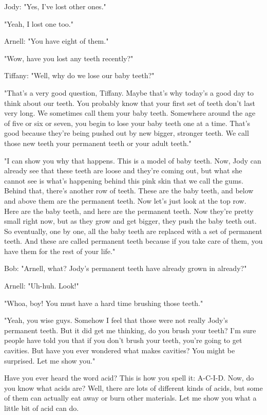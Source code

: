 Jody: "Yes, I've lost other ones."

"Yeah, I lost one too."

Arnell: "You have eight of them."

"Wow, have you lost any teeth recently?"

Tiffany: "Well, why do we lose our baby teeth?"

"That's a very good question, Tiffany. Maybe that's why today's a good day to think about our teeth. You probably know that your first set of teeth don't last very long. We sometimes call them your baby teeth. Somewhere around the age of five or six or seven, you begin to lose your baby teeth one at a time. That's good because they're being pushed out by new bigger, stronger teeth. We call those new teeth your permanent teeth or your adult teeth."

"I can show you why that happens. This is a model of baby teeth. Now, Jody can already see that these teeth are loose and they're coming out, but what she cannot see is what's happening behind this pink skin that we call the gums. Behind that, there's another row of teeth. These are the baby teeth, and below and above them are the permanent teeth. Now let's just look at the top row. Here are the baby teeth, and here are the permanent teeth. Now they're pretty small right now, but as they grow and get bigger, they push the baby teeth out. So eventually, one by one, all the baby teeth are replaced with a set of permanent teeth. And these are called permanent teeth because if you take care of them, you have them for the rest of your life."

Bob: "Arnell, what? Jody's permanent teeth have already grown in already?"

Arnell: "Uh-huh. Look!"

"Whoa, boy! You must have a hard time brushing those teeth."

"Yeah, you wise guys. Somehow I feel that those were not really Jody's permanent teeth. But it did get me thinking, do you brush your teeth? I'm sure people have told you that if you don't brush your teeth, you're going to get cavities. But have you ever wondered what makes cavities? You might be surprised. Let me show you."

Have you ever heard the word acid? This is how you spell it: A-C-I-D. Now, do you know what acids are? Well, there are lots of different kinds of acids, but some of them can actually eat away or burn other materials. Let me show you what a little bit of acid can do.

